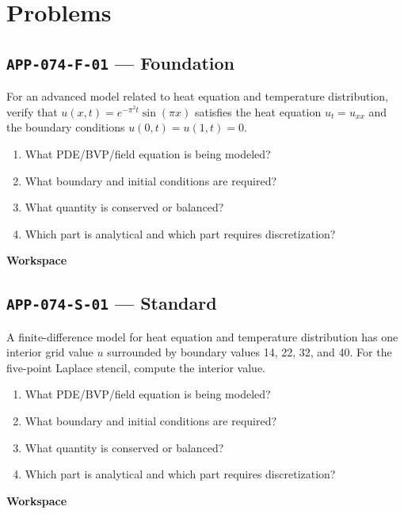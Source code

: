 \documentclass[11pt]{book}
\newcommand{\pid}[1]{\texttt{#1}}
\newcommand{\workspace}{\par\vspace{0.7in}\hrulefill\par\vspace{0.55in}\hrulefill\par}
\begin{document}
\section*{Problems}
\subsection*{\pid{APP-074-F-01} — Foundation}
\begin{problembox}
For an advanced model related to heat equation and temperature distribution, verify that $u(x,t)=e^{-\pi^2t}\sin(\pi x)$ satisfies the heat equation $u_t=u_{xx}$ and the boundary conditions $u(0,t)=u(1,t)=0$.
\end{problembox}
\begin{promptbox}\begin{enumerate}
\item What PDE/BVP/field equation is being modeled?
\item What boundary and initial conditions are required?
\item What quantity is conserved or balanced?
\item Which part is analytical and which part requires discretization?
\end{enumerate}\end{promptbox}
\textbf{Workspace}\workspace
{}
\subsection*{\pid{APP-074-S-01} — Standard}
\begin{problembox}
A finite-difference model for heat equation and temperature distribution has one interior grid value $u$ surrounded by boundary values 14, 22, 32, and 40. For the five-point Laplace stencil, compute the interior value.
\end{problembox}
\begin{promptbox}\begin{enumerate}
\item What PDE/BVP/field equation is being modeled?
\item What boundary and initial conditions are required?
\item What quantity is conserved or balanced?
\item Which part is analytical and which part requires discretization?
\end{enumerate}\end{promptbox}
\textbf{Workspace}\workspace
{}
\end{document}
